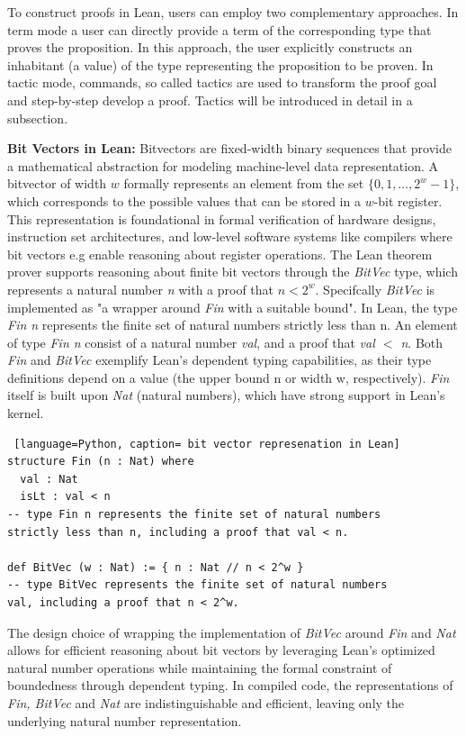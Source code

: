 To construct proofs in Lean, users can employ two complementary approaches. In term mode a user can directly provide a term of the corresponding type that proves the proposition. In this approach, the user explicitly constructs an inhabitant (a value) of the type representing the proposition to be proven. In tactic mode, commands, so called tactics are used to transform the proof goal and step-by-step develop a proof. Tactics will be introduced in detail in a subsection. 


\textbf{Bit Vectors in Lean:}
Bitvectors are fixed-width binary sequences that provide a mathematical abstraction for modeling machine-level data representation. A bitvector of width $w$ formally represents an element from the set $\{0, 1, \ldots, 2^w - 1\}$, which corresponds to the possible values that can be stored in a $w$-bit register. This representation is foundational in formal verification of hardware designs, instruction set architectures, and low-level software systems like compilers where bit vectors e.g enable reasoning about register operations. The Lean theorem prover supports reasoning about finite bit vectors through the \textit{BitVec} type, which represents a natural number \textit{n} with a proof that \( n < 2^w \). Specifcally \textit{BitVec} is implemented as "a wrapper around \textit{Fin} with a suitable bound". In Lean, the type \textit{Fin n} represents the finite set of natural numbers strictly less than n. An element of type \textit{Fin n} consist of a natural number \textit{val}, and a proof that \textit{val \( < \) n}. Both \textit{Fin} and  \textit{BitVec} exemplify Lean's dependent typing capabilities, as their type definitions depend on a value (the upper bound n or width w, respectively). \textit{Fin} itself is built upon \textit{Nat} (natural numbers), which have strong support in Lean's kernel.\newline


\begin{lstlisting} [language=Python, caption= bit vector represenation in Lean]
structure Fin (n : Nat) where
  val : Nat
  isLt : val < n 
-- type Fin n represents the finite set of natural numbers
strictly less than n, including a proof that val < n.

def BitVec (w : Nat) := { n : Nat // n < 2^w }
-- type BitVec represents the finite set of natural numbers
val, including a proof that n < 2^w.
\end{lstlisting}

 The design choice of wrapping the implementation of \textit{BitVec} around \textit{Fin} and \textit{Nat} allows for efficient reasoning about bit vectors by leveraging Lean's optimized natural number operations while maintaining the formal constraint of boundedness through dependent typing.
In compiled code, the representations of \textit{Fin, BitVec}  and \textit{Nat} are indistinguishable and efficient, leaving only the underlying natural number representation.



